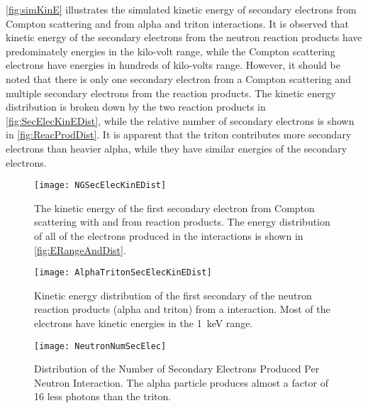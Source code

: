 \autoref{fig:simKinE} illustrates the simulated kinetic energy of secondary electrons from Compton scattering and from alpha and triton interactions.
It is observed that kinetic energy of the secondary electrons from the neutron reaction products have predominately energies in the kilo-volt range, while the Compton scattering electrons have energies in hundreds of kilo-volts range. 
However, it should be noted that there is only one secondary electron from a Compton scattering and multiple secondary electrons from the reaction products.
The kinetic energy distribution is broken down by the two reaction products in \autoref{fig:SecElecKinEDist}, while the relative number of secondary electrons is shown in \autoref{fig:ReacProdDist}.
It is apparent that the triton contributes more secondary electrons than heavier alpha, while they have similar energies of the secondary electrons.
\begin{figure}[ht]
    \centering
    \texttt{[image: NGSecElecKinEDist]}
    \caption[Kinetic Energy of Primary Secondary Electron from Compton Scattering and Neutron Reaction Products]{The kinetic energy of the first secondary electron from Compton scattering with  and from  reaction products. The energy distribution of all of the electrons produced in the interactions is shown in \autoref{fig:ERangeAndDist}.\EnergyDepSimGeo}
    \label{fig:simKinE}
\end{figure}
\begin{figure}
 	\centering
  	\texttt{[image: AlphaTritonSecElecKinEDist]}
	\caption[Kinetic Energy Distribution of Primary Secondary Electrons from the Neutron Reaction Products]{Kinetic energy distribution of the first secondary of the neutron reaction products (alpha and triton) from a  interaction.  Most of the electrons have kinetic energies in the \SI{1}{\keV} range. \EnergyDepSimGeo}
	\label{fig:SecElecKinEDist}
\end{figure}
\begin{figure}
 	\centering
  	\texttt{[image: NeutronNumSecElec]}
	\caption[Distribution of the Number of Secondary Electrons Produced Per Neutron Interaction]{Distribution of the Number of Secondary Electrons Produced Per Neutron Interaction. The alpha particle produces almost a factor of 16 less photons than the triton. \EnergyDepSimGeo}
	\label{fig:ReacProdDist}
\end{figure}

